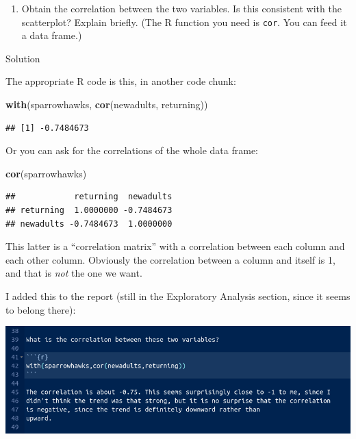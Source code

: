 \documentclass[]{tufte-book}
\newenvironment{Shaded}{}{}
\newcommand{\KeywordTok}[1]{\textcolor[rgb]{0.00,0.44,0.13}{\textbf{#1}}}
\newcommand{\NormalTok}[1]{#1}
\providecommand{\tightlist}{%
  \setlength{\itemsep}{0pt}\setlength{\parskip}{0pt}}
\theoremstyle{definition}
\theoremstyle{definition}
\theoremstyle{definition}
\theoremstyle{remark}
\begin{document}
\begin{enumerate}
\def\labelenumi{(\alph{enumi})}
\setcounter{enumi}{3}
\tightlist
\item
  Obtain the correlation between the two variables. Is this consistent
  with the scatterplot? Explain briefly. (The R function you need is
  \texttt{cor}. You can feed it a data frame.)
\end{enumerate}

Solution

The appropriate R code is this, in another code chunk:

\begin{Shaded}
\begin{Highlighting}[]
\KeywordTok{with}\NormalTok{(sparrowhawks, }\KeywordTok{cor}\NormalTok{(newadults, returning))}
\end{Highlighting}
\end{Shaded}

\begin{verbatim}
## [1] -0.7484673
\end{verbatim}

Or you can ask for the correlations of the whole data frame:

\begin{Shaded}
\begin{Highlighting}[]
\KeywordTok{cor}\NormalTok{(sparrowhawks)}
\end{Highlighting}
\end{Shaded}

\begin{verbatim}
##            returning  newadults
## returning  1.0000000 -0.7484673
## newadults -0.7484673  1.0000000
\end{verbatim}

This latter is a ``correlation matrix'' with a correlation between each
column and each other column. Obviously the correlation between a column
and itself is 1, and that is \emph{not} the one we want.

I added this to the report (still in the Exploratory Analysis section,
since it seems to belong there):

\includegraphics{sh5.png}
\end{document}
